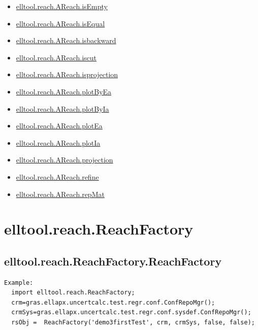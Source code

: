 \documentclass[letterpaper,10pt,english]{sphinxmanual}
\begin{document}
\begin{itemize}
\item {} 
{\hyperref[chap_functions:elltool-reach-areach-isempty]{elltool.reach.AReach.isEmpty}}

\item {} 
{\hyperref[chap_functions:elltool-reach-areach-isequal]{elltool.reach.AReach.isEqual}}

\item {} 
{\hyperref[chap_functions:elltool-reach-areach-isbackward]{elltool.reach.AReach.isbackward}}

\item {} 
{\hyperref[chap_functions:elltool-reach-areach-iscut]{elltool.reach.AReach.iscut}}

\item {} 
{\hyperref[chap_functions:elltool-reach-areach-isprojection]{elltool.reach.AReach.isprojection}}

\item {} 
{\hyperref[chap_functions:elltool-reach-areach-plotbyea]{elltool.reach.AReach.plotByEa}}

\item {} 
{\hyperref[chap_functions:elltool-reach-areach-plotbyia]{elltool.reach.AReach.plotByIa}}

\item {} 
{\hyperref[chap_functions:elltool-reach-areach-plotea]{elltool.reach.AReach.plotEa}}

\item {} 
{\hyperref[chap_functions:elltool-reach-areach-plotia]{elltool.reach.AReach.plotIa}}

\item {} 
{\hyperref[chap_functions:elltool-reach-areach-projection]{elltool.reach.AReach.projection}}

\item {} 
{\hyperref[chap_functions:elltool-reach-areach-refine]{elltool.reach.AReach.refine}}

\item {} 
{\hyperref[chap_functions:elltool-reach-areach-repmat]{elltool.reach.AReach.repMat}}

\end{itemize}


\section{elltool.reach.ReachFactory}
\label{chap_functions:elltool-reach-reachfactory}

\subsection{elltool.reach.ReachFactory.ReachFactory}
\label{chap_functions:elltool-reach-reachfactory-reachfactory}
\begin{Verbatim}[commandchars=\\\{\}]
Example:
  import elltool.reach.ReachFactory;
  crm=gras.ellapx.uncertcalc.test.regr.conf.ConfRepoMgr();
  crmSys=gras.ellapx.uncertcalc.test.regr.conf.sysdef.ConfRepoMgr();
  rsObj =  ReachFactory('demo3firstTest', crm, crmSys, false, false);
\end{Verbatim}
\end{document}

